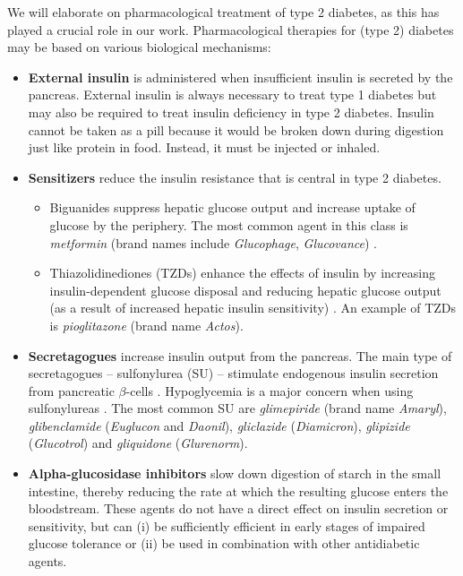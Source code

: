 We will elaborate on pharmacological treatment of type 2 diabetes, as this has played a crucial role in our work. Pharmacological therapies for (type 2) diabetes may be based on various biological mechanisms:
\begin{itemize}
\item \textbf{External insulin} is administered when insufficient insulin is secreted by the pancreas. External insulin is always necessary to treat type 1 diabetes but may also be required to treat insulin deficiency in type 2 diabetes. Insulin cannot be taken as a pill because it would be broken down during digestion just like protein in food. Instead, it must be injected or inhaled. \\
\item \textbf{Sensitizers} reduce the insulin resistance that is central in type 2 diabetes.
\begin{itemize}
        \item Biguanides suppress hepatic glucose output and increase uptake of glucose by the periphery. The most common agent in this class is \emph{metformin} (brand names include \emph{Glucophage}, \emph{Glucovance}) \citep{kirpichnikov2002metformin}. \\ %
        \item Thiazolidinediones (TZDs) enhance the effects of insulin by increasing insulin-dependent glucose disposal and reducing hepatic glucose output (as a result of increased hepatic insulin sensitivity) \citep{saltiel1996thiazolidinediones, yki2004thiazolidinediones}. 
        An example of TZDs is \emph{pioglitazone} (brand name \emph{Actos}). \\
\end{itemize}
\item \textbf{Secretagogues} increase insulin output from the pancreas. The main type of secretagogues -- sulfonylurea (SU) -- stimulate endogenous insulin secretion from pancreatic $\beta$-cells \citep{proks2002sulfonylurea}. Hypoglycemia is a major concern when using sulfonylureas \citep{bodmer2008metformin}.
        The most common SU are \emph{glimepiride} (brand name \emph{Amaryl}), \emph{glibenclamide} (\emph{Euglucon} and \emph{Daonil}), \emph{gliclazide} (\emph{Diamicron}), \emph{glipizide} (\emph{Glucotrol}) and \emph{gliquidone} (\emph{Glurenorm}). \\
\item \textbf{Alpha-glucosidase inhibitors} slow down digestion of starch in the small intestine, thereby reducing the rate at which the resulting glucose enters the bloodstream. These agents do not have a direct effect on insulin secretion or sensitivity, but can (i) be sufficiently efficient in early stages of impaired glucose tolerance or (ii) be used in combination with other antidiabetic agents. 

\end{itemize}
